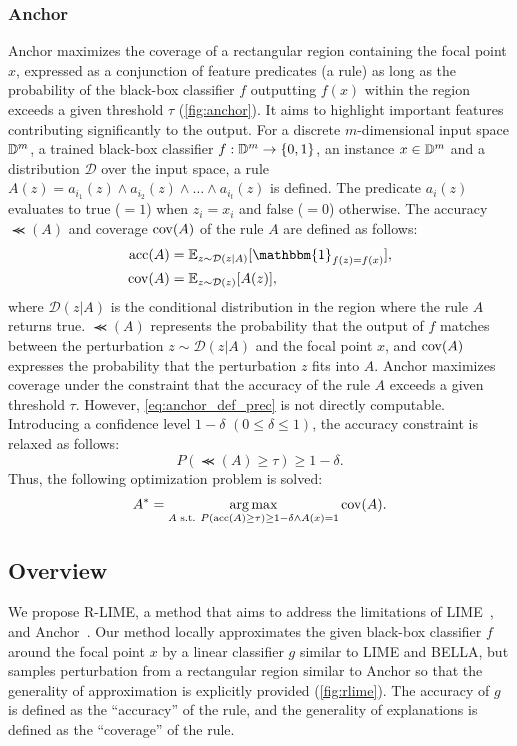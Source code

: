 \documentclass[11pt]{article}
\begin{document}
\subsubsection[Anchor]{%
  Anchor~\cite{ribeiro2018anchors}
}\label{sec:anchor}
Anchor maximizes the coverage of a rectangular region
containing the focal point $x$,
expressed as a conjunction of feature predicates (a rule)
as long as the probability of the black-box classifier $f$
outputting $f(x)$ within the region exceeds a given threshold $\tau$
(\cref{fig:anchor}).
It aims to highlight important features
contributing significantly to the output.
For a discrete $m$-dimensional input space $\mathbb{D}^{m}$,
a trained black-box classifier $f: \mathbb{D}^{m} \to \{0,1\}$,
an instance $x \in \mathbb{D}^{m}$
and a distribution $\mathcal{D}$ over the input space,
a rule $A(z) = a_{i_1}(z) \wedge a_{i_2}(z) \wedge \dots \wedge a_{i_t}(z)$ is defined.
The predicate $a_i(z)$ evaluates to true ($=1$) when $z_i = x_i$ and false ($=0$) otherwise.
The accuracy $\Prec(A)$ and coverage $\operatorname{cov}(A)$ of the rule $A$ are defined as follows:
\begin{align}
  \Prec(A) & =\mathbb{E}_{z\sim\mathcal{D}(z|A)}
  [\mathbbm{1}_{f(z)=f(x)}], \label{eq:anchor_def_prec} \\
  \Cov(A)  & =\mathbb{E}_{z\sim\mathcal{D}(z)}[A(z)],
\end{align}
where $\mathcal{D}(z|A)$ is the conditional distribution in the region
where the rule $A$ returns true.
$\Prec(A)$ represents the probability that the output of $f$ matches
between the perturbation $z\sim\mathcal{D}(z|A)$ and the focal point $x$,
and $\operatorname{cov}(A)$ expresses the probability that the perturbation $z$ fits into $A$.
Anchor maximizes coverage under the constraint that
the accuracy of the rule $A$ exceeds a given threshold $\tau$.
However, \cref{eq:anchor_def_prec} is not directly computable.
Introducing a confidence level $1-\delta$ $(0\le\delta\le1)$,
the accuracy constraint is relaxed as follows:
\begin{equation}
  \label{eq:const_prec}
  P(\Prec(A)\ge\tau)\ge1-\delta.
\end{equation}
Thus, the following optimization problem is solved:
\begin{equation}
  \label{eq:main_problem}
  A^*=\underset{A \text{~s.t. } P(\operatorname{acc}(A)\ge\tau)\ge1-\delta\wedge A(x)=1}
  {\arg\max}\operatorname{cov}(A).
\end{equation}

\subsection{Overview}
We propose R-LIME,
a method that aims to address the limitations of LIME~\cite{ribeiro2016why},
and Anchor~\cite{ribeiro2018anchors}.
Our method locally approximates the given black-box classifier $f$
around the focal point $x$ by a linear classifier $g$ similar to LIME and BELLA,
but samples perturbation from a rectangular region similar to Anchor
so that the generality of approximation is explicitly provided
(\cref{fig:rlime}).
The accuracy of $g$ is defined as the ``accuracy'' of the rule,
and the generality of explanations is defined as the ``coverage'' of the rule.
\end{document}
